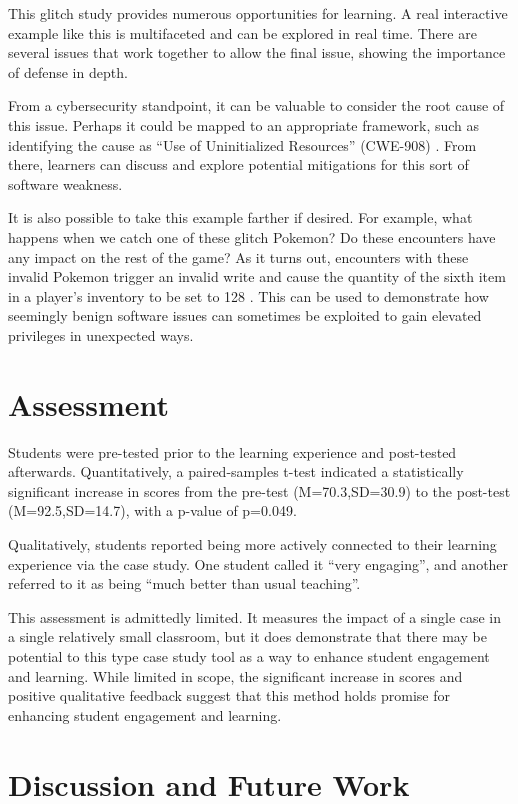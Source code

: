 \documentclass[letterpaper]{article}
\begin{document}
This glitch study provides numerous opportunities for learning. A real interactive example like this is multifaceted and can be explored in real time. There are several issues that work together to allow the final issue, showing the importance of defense in depth.

From a cybersecurity standpoint, it can be valuable to consider the root cause of this issue. Perhaps it could be mapped to an appropriate framework, such as identifying the cause as ``Use of Uninitialized Resources'' (CWE-908) \cite{mitre2012}. From there, learners can discuss and explore potential mitigations for this sort of software weakness.

It is also possible to take this example farther if desired. For example, what happens when we catch one of these glitch Pokemon? Do these encounters have any impact on the rest of the game? As it turns out, encounters with these invalid Pokemon trigger an invalid write and cause the quantity of the sixth item in a player's inventory to be set to 128 \cite{bulbapedia2010}. This can be used to demonstrate how seemingly benign software issues can sometimes be exploited to gain elevated privileges in unexpected ways.

\section{Assessment}
Students were pre-tested prior to the learning experience and post-tested afterwards. Quantitatively, a paired-samples t-test indicated a statistically significant increase in scores from the pre-test (M=70.3,SD=30.9) to the post-test (M=92.5,SD=14.7), with a p-value of p=0.049.

Qualitatively, students reported being more actively connected to their learning experience via the case study. One student called it ``very engaging'', and another referred to it as being ``much better than usual teaching''.

This assessment is admittedly limited. It measures the impact of a single case in a single relatively small classroom, but it does demonstrate that there may be potential to this type case study tool as a way to enhance student engagement and learning. While limited in scope, the significant increase in scores and positive qualitative feedback suggest that this method holds promise for enhancing student engagement and learning.

\section{Discussion and Future Work}
\end{document}
